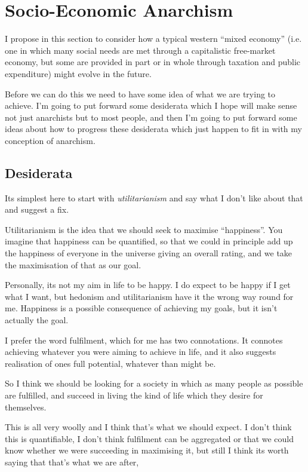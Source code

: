 \section{Socio-Economic Anarchism}\label{Socio-economic}

I propose in this section to consider how a typical western ``mixed economy'' (i.e. one in which many social needs are met through a capitalistic free-market economy, but some are provided in part or in whole through taxation and public expenditure) might evolve in the future.

Before we can do this we need to have some idea of what we are trying to achieve.
I'm going to put forward some desiderata which I hope will make sense not just anarchists but to most people, and then I'm going to put forward some ideas about how to progress these desiderata which just happen to fit in with my conception of anarchism.

\subsection{Desiderata}

Its simplest here to start with {\it utilitarianism} and say what I don't like about that and suggest a fix.

Utilitarianism is the idea that we should seek to maximise ``happiness''.
You imagine that happiness can be quantified, so that we could in principle add up the happiness of everyone in the universe giving an overall rating, and we take the maximisation of that as our goal.

Personally, its not my aim in life to be happy.
I do expect to be happy if I get what I want, but hedonism and utilitarianism have it the wrong way round for me.
Happiness is a possible consequence of achieving my goals, but it isn't actually the goal.
 
I prefer the word fulfilment, which for me has two connotations.
It connotes achieving whatever you were aiming to achieve in life, and it also suggests realisation of ones full potential, whatever than might be.

So I think we should be looking for a society in which as many people as possible are fulfilled, and succeed in living the kind of life which they desire for themselves.

This is all very woolly and I think that's what we should expect.
I don't think this is quantifiable, I don't think fulfilment can be aggregated or that we could know whether we were succeeding in maximising it, but still I think its worth saying that that's what we are after,

